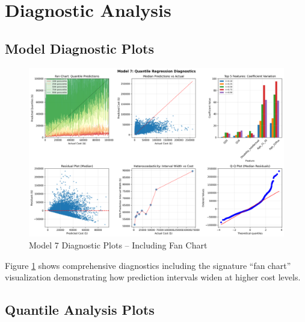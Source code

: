 \section{Diagnostic Analysis}

\subsection{Model Diagnostic Plots}

\begin{figure}[h!]
\centering
\includegraphics[width=\textwidth]{models/model_7/diagnostic_plots.png}
\caption{Model 7 Diagnostic Plots -- Including Fan Chart}
\label{fig:model7_diagnostics}
\end{figure}

Figure \ref{fig:model7_diagnostics} shows comprehensive diagnostics including the signature ``fan chart'' visualization demonstrating how prediction intervals widen at higher cost levels.

\subsection{Quantile Analysis Plots}

